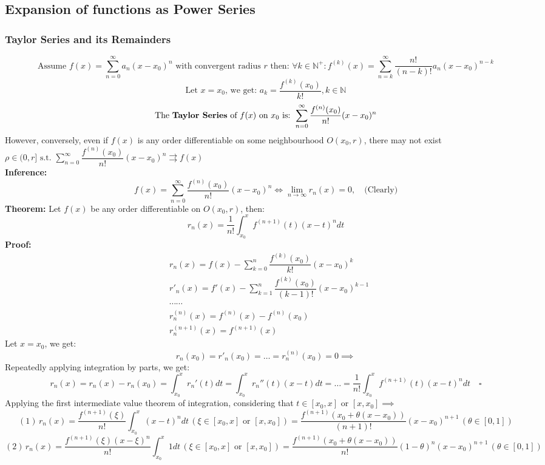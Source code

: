 \documentclass{article}
\newcommand{\N}{\mathbb{N}}
\newcommand{\ucov}{\rightrightarrows}
\newcommand{\limninf}{\lim\limits_{n\to\infty}}
\newcommand{\st}{\mbox{ s.t. }}
\newcommand{\0}{{\bf{0}}}
\begin{document}
\subsection{Expansion of functions as Power Series}
\subsubsection{Taylor Series and its Remainders}
$$\mbox{Assume }f(x)=\sum_{n=0}^\infty a_n(x-x_0)^n\mbox{ with convergent radius }r\mbox{ then: }\forall k\in\N^+:f^{(k)}(x)=\sum_{n=k}^\infty\dfrac{n!}{(n-k)!}a_n(x-x_0)^{n-k}$$
$$\mbox{Let }x=x_0\mbox{, we get: }a_k=\frac{f^{(k)}(x_0)}{k!},k\in\N$$
$$\mbox{The \textbf{Taylor Series} of }f(x)\mbox{ on }x_0\mbox{ is: }\sum_{n=0}^\infty\frac{f^{(n)}(x_0)}{n!}(x-x_0)^n$$
However, conversely, even if $f(x)$ is any order differentiable on some neighbourhood $O(x_0,r)$, there may not exist $\rho\in(0,r]\st\sum\limits_{n=0}^\infty\dfrac{f^{(n)}(x_0)}{n!}(x-x_0)^n\ucov f(x)$\\
\textbf{Inference:}
$$f(x)=\sum_{n=0}^\infty \dfrac{f^{(n)}(x_0)}{n!}(x-x_0)^n\iff\limninf r_n(x)=0,\quad\mbox{(Clearly)}$$
\textbf{Theorem:}
Let $f(x)$ be any order differentiable on $O(x_0,r)$, then:
$$r_n(x)=\frac{1}{n!}\int_{x_0}^xf^{(n+1)}(t)(x-t)^ndt$$
\textbf{Proof:}
\begin{equation}
\begin{split}
    &r_n(x)=f(x)-\sum_{k=0}^n\dfrac{f^{(k)}(x_0)}{k!}(x-x_0)^k\\
    &r'_n(x)=f'(x)-\sum_{k=1}^n\dfrac{f^{(k)}(x_0)}{(k-1)!}(x-x_0)^{k-1}\\
    &\cdots\cdots\\
    &r^{(n)}_n(x)=f^{(n)}(x)-f^{(n)}(x_0)\\
    &r^{(n+1)}_n(x)=f^{(n+1)}(x)
\end{split}
\end{equation}
Let $x=x_0$, we get:
$$r_n(x_0)=r'_n(x_0)=\dots=r^{(n)}_n(x_0)=0\implies$$
Repeatedly applying integration by parts, we get:
$$r_n(x)=r_n(x)-r_n(x_0)=\int_{x_0}^xr_n'(t)dt=\int_{x_0}^xr_n''(t)(x-t)dt=\dots=\frac{1}{n!}\int_{x_0}^xf^{(n+1)}(t)(x-t)^ndt\quad\square$$
Applying the first intermediate value theorem of integration, considering that $t\in[x_0,x]$ or $[x,x_0]\implies$
$$(1)\,r_n(x)=\dfrac{f^{(n+1)}(\xi)}{n!}\int_{x_0}^x(x-t)^ndt\,(\xi\in[x_0,x]\mbox{ or }[x,x_0])=\frac{f^{(n+1)}(x_0+\theta(x-x_0))}{(n+1)!}(x-x_0)^{n+1}\,(\theta\in[0,1])$$
$$(2)\,r_n(x)=\dfrac{f^{(n+1)}(\xi)(x-\xi)^n}{n!}\int_{x_0}^x1dt\,(\xi\in[x_0,x]\mbox{ or }[x,x_0])=\frac{f^{(n+1)}(x_0+\theta(x-x_0))}{n!}(1-\theta)^n(x-x_0)^{n+1}\,(\theta\in[0,1])$$
\end{document}
